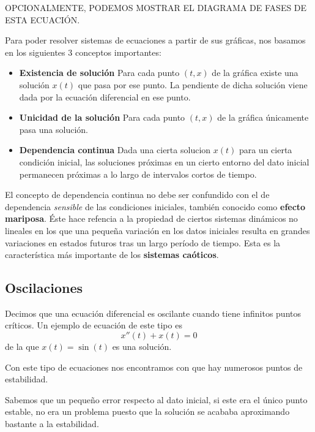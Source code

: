 OPCIONALMENTE, PODEMOS MOSTRAR EL DIAGRAMA DE FASES DE ESTA ECUACIÓN.\newline

Para poder resolver sistemas de ecuaciones a partir de sus gráficas, nos basamos en los siguientes 3 conceptos importantes:

\begin{itemize}
\item \textbf{Existencia de solución} Para cada punto $(t,x)$ de la gráfica existe una  solución $x(t)$ que pasa por ese punto. La pendiente de dicha solución viene dada por la ecuación diferencial en ese punto.
\item \textbf{Unicidad de la solución} Para cada punto $(t,x)$ de la gráfica únicamente pasa una solución.
\item \textbf{Dependencia continua} Dada una cierta solucion $x(t)$ para un cierta condición inicial, las soluciones próximas en un cierto entorno del dato inicial permanecen próximas a lo largo de intervalos cortos de tiempo.
\end{itemize}

El concepto de dependencia continua no debe ser confundido con el de dependencia \emph{sensible} de las condiciones iniciales, también conocido como \textbf{efecto mariposa}. Éste hace refencia a la propiedad de ciertos sistemas dinámicos no lineales en los que una pequeña variación en los datos iniciales resulta en grandes variaciones en estados futuros tras un largo período de tiempo. Esta es la característica más importante de los \textbf{sistemas caóticos}.

\subsection{Oscilaciones}

\begin{definition}
Decimos que una ecuación diferencial es oscilante cuando tiene infinitos puntos críticos. Un ejemplo de ecuación de este tipo es
\[x''(t)+x(t)=0\]
de la que $x(t)=\sin(t)$ es una solución.
\end{definition}

Con este tipo de ecuaciones nos encontramos con que hay numerosos puntos de estabilidad.

Sabemos que un pequeño error respecto al dato inicial, si este era el único punto estable, no era un problema puesto que la solución se acababa aproximando bastante a la estabilidad.

